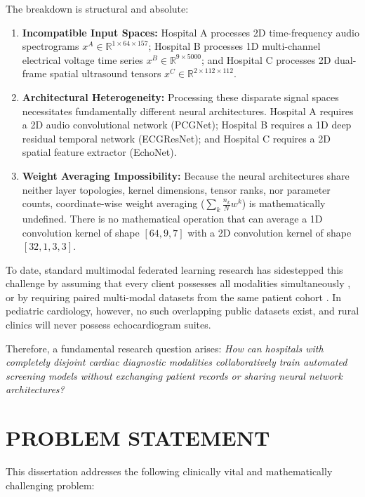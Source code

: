 \documentclass[12pt,a4paper]{amritareport}
\begin{document}
The breakdown is structural and absolute:
\begin{enumerate}
	\item \textbf{Incompatible Input Spaces:} Hospital A processes 2D time-frequency audio spectrograms $x^A \in \mathbb{R}^{1 \times 64 \times 157}$; Hospital B processes 1D multi-channel electrical voltage time series $x^B \in \mathbb{R}^{9 \times 5000}$; and Hospital C processes 2D dual-frame spatial ultrasound tensors $x^C \in \mathbb{R}^{2 \times 112 \times 112}$.
	\item \textbf{Architectural Heterogeneity:} Processing these disparate signal spaces necessitates fundamentally different neural architectures. Hospital A requires a 2D audio convolutional network (PCGNet); Hospital B requires a 1D deep residual temporal network (ECGResNet); and Hospital C requires a 2D spatial feature extractor (EchoNet). 
	\item \textbf{Weight Averaging Impossibility:} Because the neural architectures share neither layer topologies, kernel dimensions, tensor ranks, nor parameter counts, coordinate-wise weight averaging ($\sum_k \frac{n_k}{N} w^k$) is mathematically undefined. There is no mathematical operation that can average a 1D convolution kernel of shape $[64, 9, 7]$ with a 2D convolution kernel of shape $[32, 1, 3, 3]$.
\end{enumerate}

To date, standard multimodal federated learning research has sidestepped this challenge by assuming that every client possesses all modalities simultaneously \cite{feng2023fedmultimodal}, or by requiring paired multi-modal datasets from the same patient cohort \cite{chen2023federated}. In pediatric cardiology, however, no such overlapping public datasets exist, and rural clinics will never possess echocardiogram suites. 

Therefore, a fundamental research question arises: \textit{How can hospitals with completely disjoint cardiac diagnostic modalities collaboratively train automated screening models without exchanging patient records or sharing neural network architectures?}


\section{PROBLEM STATEMENT}

This dissertation addresses the following clinically vital and mathematically challenging problem:
\end{document}
